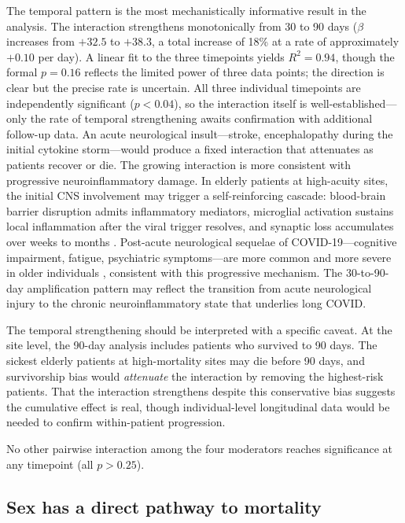 \documentclass{article}
\begin{document}
The temporal pattern is the most mechanistically informative result in the analysis.
The interaction strengthens monotonically from 30 to 90 days ($\beta$ increases from $+32.5$ to $+38.3$, a total increase of 18\% at a rate of approximately $+0.10$ per day).
A linear fit to the three timepoints yields $R^2 = 0.94$, though the formal $p = 0.16$ reflects the limited power of three data points; the direction is clear but the precise rate is uncertain.
All three individual timepoints are independently significant ($p < 0.04$), so the interaction itself is well-established---only the rate of temporal strengthening awaits confirmation with additional follow-up data.
An acute neurological insult---stroke, encephalopathy during the initial cytokine storm---would produce a fixed interaction that attenuates as patients recover or die.
The growing interaction is more consistent with progressive neuroinflammatory damage.
In elderly patients at high-acuity sites, the initial CNS involvement may trigger a self-reinforcing cascade: blood-brain barrier disruption admits inflammatory mediators, microglial activation sustains local inflammation after the viral trigger resolves, and synaptic loss accumulates over weeks to months \cite{douaud2022brain}.
Post-acute neurological sequelae of COVID-19---cognitive impairment, fatigue, psychiatric symptoms---are more common and more severe in older individuals \cite{nalbandian2021pasc, taquet2021neuro}, consistent with this progressive mechanism.
The 30-to-90-day amplification pattern may reflect the transition from acute neurological injury to the chronic neuroinflammatory state that underlies long COVID.

The temporal strengthening should be interpreted with a specific caveat.
At the site level, the 90-day analysis includes patients who survived to 90 days.
The sickest elderly patients at high-mortality sites may die before 90 days, and survivorship bias would \emph{attenuate} the interaction by removing the highest-risk patients.
That the interaction strengthens despite this conservative bias suggests the cumulative effect is real, though individual-level longitudinal data would be needed to confirm within-patient progression.

No other pairwise interaction among the four moderators reaches significance at any timepoint (all $p > 0.25$).


\subsection{Sex has a direct pathway to mortality}
\end{document}
